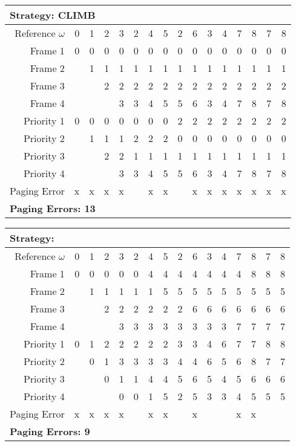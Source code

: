 \documentclass[a4paper, 11pt]{article}
\begin{document}
      \begin{center}
      \begin{tabular}{|r||r|r|r|r|r|r|r|r|r|r|r|r|r|r|r|}
            \multicolumn{16}{l}{\textbf{Strategy: CLIMB}}\\
            \hline
                  Reference $\omega$ & 0 & 1 & 2 & 3 & 2 & 4 & 5 & 2 & 6 & 3 & 4 & 7 & 8 & 7 & 8 \\
            \hline\hline
                  Frame 1    &0&0&0&0&0&0&0&0&0&0&0&0&0&0&0   \\\hline
                  Frame 2    &&1&1&1&1&1&1&1&1&1&1&1&1&1&1   \\\hline
                  Frame 3    &&&2&2&2&2&2&2&2&2&2&2&2&2&2   \\\hline
                  Frame 4    &&&&3&3&4&5&5&6&3&4&7&8&7&8   \\
            \hline\hline
                  Priority 1 &0&0&0&0&0&0&0&2&2&2&2&2&2&2&2   \\\hline
                  Priority 2 &&1&1&1&2&2&2&0&0&0&0&0&0&0&0   \\\hline
                  Priority 3 &&&2&2&1&1&1&1&1&1&1&1&1&1&1   \\\hline
                  Priority 4 &&&&3&3&4&5&5&6&3&4&7&8&7&8   \\
            \hline\hline
                  Paging Error  &x&x&x&x&&x&x&&x&x&x&x&x&x&x   \\
            \hline
            \multicolumn{16}{l}{\textbf{Paging Errors: 13}}\\
      \end{tabular}
      \end{center}
      \begin{center}
      \begin{tabular}{|r||r|r|r|r|r|r|r|r|r|r|r|r|r|r|r|}
            \multicolumn{16}{l}{\textbf{Strategy:}}\\
            \hline
                  Reference $\omega$ & 0 & 1 & 2 & 3 & 2 & 4 & 5 & 2 & 6 & 3 & 4 & 7 & 8 & 7 & 8 \\
            \hline\hline
                  Frame 1    &0&0&0&0&0&4&4&4&4&4&4&4&8&8&8   \\\hline
                  Frame 2    &&1&1&1&1&1&5&5&5&5&5&5&5&5&5   \\\hline
                  Frame 3    &&&2&2&2&2&2&2&6&6&6&6&6&6&6   \\\hline
                  Frame 4    &&&&3&3&3&3&3&3&3&3&7&7&7&7   \\
            \hline\hline
                  Priority 1 &0&1&2&2&2&2&2&3&3&4&6&7&7&8&8   \\\hline
                  Priority 2 &&0&1&3&3&3&3&4&4&6&5&6&8&7&7   \\\hline
                  Priority 3 &&&0&1&1&4&4&5&6&5&4&5&6&6&6   \\\hline
                  Priority 4 &&&&0&0&1&5&2&5&3&3&4&5&5&5   \\
            \hline\hline
                  Paging Error  &x&x&x&x&&x&x&&x&&&x&x&&   \\
            \hline
            \multicolumn{16}{l}{\textbf{Paging Errors: 9}}\\
      \end{tabular}
      \end{center}
\end{document}
